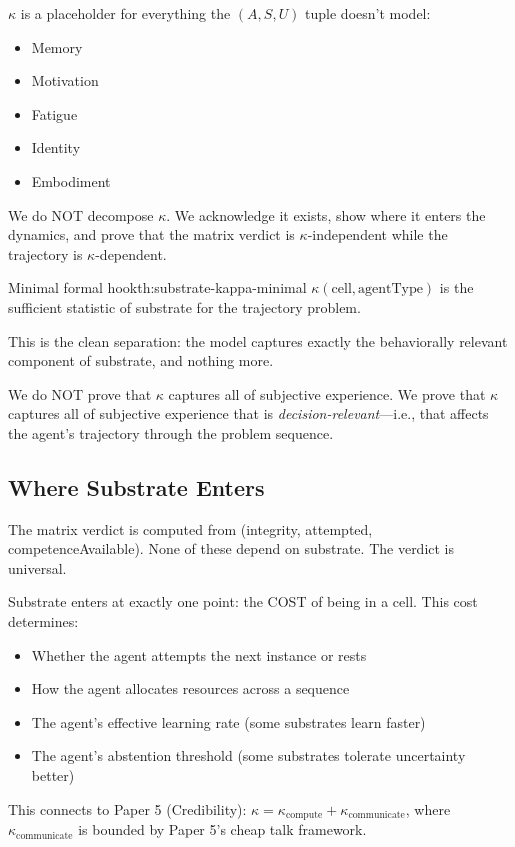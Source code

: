 $\kappa$ is a placeholder for everything the $(A, S, U)$ tuple doesn't model:
\begin{itemize}
\item Memory
\item Motivation
\item Fatigue  
\item Identity
\item Embodiment
\end{itemize}

We do NOT decompose $\kappa$. We acknowledge it exists, show where it enters the dynamics, and prove that the matrix verdict is $\kappa$-independent while the trajectory is $\kappa$-dependent.

\begin{claim}{Minimal formal hook}{th:substrate-kappa-minimal}
$\kappa(\text{cell}, \text{agentType})$ is the sufficient statistic of substrate for the trajectory problem.
\end{claim}


This is the clean separation: the model captures exactly the behaviorally relevant component of substrate, and nothing more.

We do NOT prove that $\kappa$ captures all of subjective experience. We prove that $\kappa$ captures all of subjective experience that is \emph{decision-relevant}---i.e., that affects the agent's trajectory through the problem sequence.

\subsection{Where Substrate Enters}

The matrix verdict is computed from (integrity, attempted, competenceAvailable). None of these depend on substrate. The verdict is universal.

Substrate enters at exactly one point: the COST of being in a cell. This cost determines:
\begin{itemize}
\item Whether the agent attempts the next instance or rests
\item How the agent allocates resources across a sequence
\item The agent's effective learning rate (some substrates learn faster)
\item The agent's abstention threshold (some substrates tolerate uncertainty better)
\end{itemize}

This connects to Paper 5 (Credibility): $\kappa = \kappa_{\text{compute}} + \kappa_{\text{communicate}}$, where $\kappa_{\text{communicate}}$ is bounded by Paper 5's cheap talk framework.
